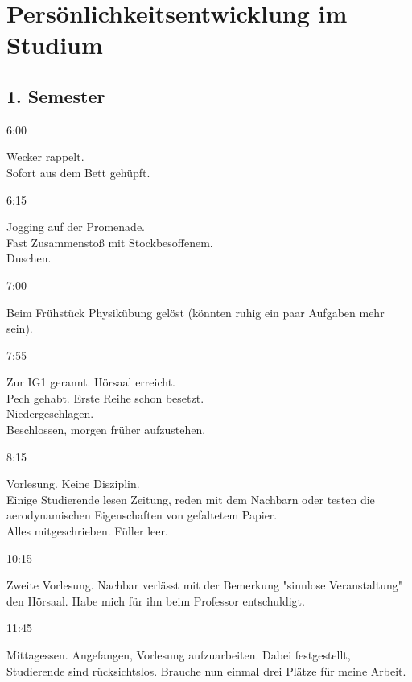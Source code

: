 
\newcommand{\fibelpeentry}[2]{#1 \hfill
\begin{minipage}[t]{8.2cm}
#2
\end{minipage}}

\section{Persönlichkeitsentwicklung im Studium}
\begin{multicols*}{2}
\setlength{\parskip}{0.5cm minus 0.2cm}

\subsection*{1. Semester}
\fibelpeentry{6:00}{
Wecker rappelt.\\
Sofort aus dem Bett gehüpft.
}

\fibelpeentry{6:15}{
Jogging auf der Promenade.\\
Fast Zusammenstoß mit Stockbesoffenem.\\
Duschen.
}

\fibelpeentry{7:00}{
Beim Frühstück Physikübung gelöst (könnten ruhig ein paar Aufgaben mehr sein).
}

\fibelpeentry{7:55}{
Zur IG1 gerannt. Hörsaal erreicht.\\
Pech gehabt. Erste Reihe schon besetzt.\\
Niedergeschlagen.\\
Beschlossen, morgen früher aufzustehen.
}

\fibelpeentry{8:15}{
Vorlesung. Keine Disziplin.\\
Einige Studierende lesen Zeitung, reden mit dem Nachbarn oder testen die aerodynamischen Eigenschaften von gefaltetem Papier.\\
Alles mitgeschrieben. Füller leer.
}

\fibelpeentry{10:15}{
Zweite Vorlesung. Nachbar verlässt mit der Bemerkung "sinnlose Veranstaltung" den Hörsaal. Habe mich für ihn beim Professor entschuldigt.
}

\fibelpeentry{11:45}{
Mittagessen. Angefangen, Vorlesung aufzuarbeiten. Dabei festgestellt, Studierende sind rücksichtslos. Brauche nun einmal drei Plätze für meine Arbeit.
}


\end{multicols*}
